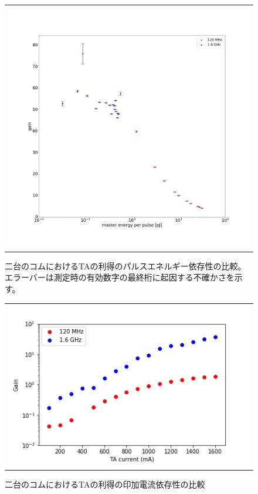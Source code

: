 \documentclass[uplatex, dvipdfmx, a4paper, report, papersize, 11pt]{jsbook}
\begin{document}
\begin{figure}[htpb]
\begin{tabular}{c}
      \begin{minipage}{1\hsize}
        \centering
          \includegraphics[keepaspectratio,  scale=0.25,  angle=0]
                          {figures/chapter4/pulse_power-gain-comparison_errorbar.png}
                          \caption{二台のコムにおけるTAの利得のパルスエネルギー依存性の比較。エラーバーは測定時の有効数字の最終桁に起因する不確かさを示す。}
                          \label{pulse_power-gain-comparison}
      \end{minipage}
    \end{tabular}
\end{figure}

\newpage
\begin{figure}[H]
  \centering
    \begin{tabular}{c}
      \begin{minipage}{1\hsize}
        \centering
          \includegraphics[keepaspectratio,  scale=0.8,  angle=0]
          {figures/chapter4/TA_cuurent-gain_comparison.png}
          \caption{二台のコムにおけるTAの利得の印加電流依存性の比較}
          \label{TA_cuurent-gain_comparison}
      \end{minipage}
    \end{tabular}
\end{figure}
\newpage
\end{document}
